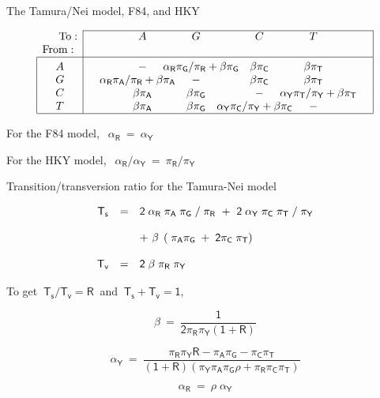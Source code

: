 \documentclass[bluish,slideColor,colorBG,pdf]{prosper}
\begin{document}
\begin{slide}[Replace]{The Tamura/Nei model, F84, and HKY}

\begin{displaymath}
\begin{array}{r | c c c c c c c c c c c |}
\cline{2-12}
            {\rm To:} & & ~~~~~~ & A & & G & ~~~~~~ & C & & T & & \\
{\rm From:~}     & & ~~~~~~ &   & &   & ~~~~~~ &   & &   & & \\
\hline
\multicolumn{1}{|c|}{\raisebox{3pt}{\strut}A} & & ~~~~~~ & -       & \multicolumn{3}{r}{\mathsf{\alpha_R \pi_G/\pi_R + \beta \pi_G}}& \mathsf{\beta \pi_C}  & & \mathsf{\beta \pi_T} & & \\
\multicolumn{1}{|c|}{G} & & \multicolumn{3}{l}{\mathsf{\alpha_R \pi_A/\pi_R + \beta \pi_A}} &         -           & ~~~~~~ & \mathsf{\beta \pi_C} & & \mathsf{\beta \pi_T} & & \\
\multicolumn{1}{|c|}{C} & & ~~~~~~ & \mathsf{\beta \pi_A} & & \mathsf{\beta \pi_G} & ~~~~~~ &  - &  \multicolumn{3}{l}{\mathsf{\alpha_Y \pi_T/\pi_Y + \beta \pi_T}} & \\
\multicolumn{1}{|c|}{T} & & ~~~~~~ & \mathsf{\beta \pi_A} & & \mathsf{\beta \pi_G} &\multicolumn{3}{r}{\mathsf{\alpha_Y \pi_C/\pi_Y  + \beta \pi_C}} & - & & \\
\hline
\end{array}
\end{displaymath}
\bigskip

For the F84 model, $~~\mathsf{\alpha_R\ =\ \alpha_Y}$
\bigskip


For the HKY model, $~~\mathsf{\alpha_R/\alpha_Y\ =\ \pi_R/\pi_Y}$

\end{slide}

\begin{slide}[Replace]{Transition/transversion ratio for the Tamura-Nei model}

\[
\begin{array}{c c l}
\mathsf{T_s} & \mathsf{=} & \mathsf{2\;\alpha_R\;\pi_A\;\pi_G\;/\;\pi_R\ +\ 2\;\alpha_Y\;\pi_C\;\pi_T\;/\;\pi_Y}\\
& & \\
& &  \mathsf{+\ \beta\;\left(\;\pi_A\pi_G\;+\;2\pi_C\;\pi_T\right)}\\
& & \\
\mathsf{T_v} & \mathsf{=} & \mathsf{2\;\beta\;\pi_R\;\pi_Y}
\end{array}
\]

To get $\mathsf{~T_s/T_v = R~}$ and $~\mathsf{T_s + T_v = 1}$,

\[
\mathsf{\beta \ = \ \frac{1}{2\pi_R\pi_Y(1+R)}}
\]

\[
\mathsf{\alpha_Y \ = \ \frac{\pi_R\pi_YR - \pi_A\pi_G - \pi_C\pi_T}{(1+R)\left(\pi_Y\pi_A\pi_G\rho + \pi_R\pi_C\pi_T\right)}}
\]

\[
\mathsf{\alpha_R \ = \ \rho\;\alpha_Y}
\]

\end{slide}
\end{document}
